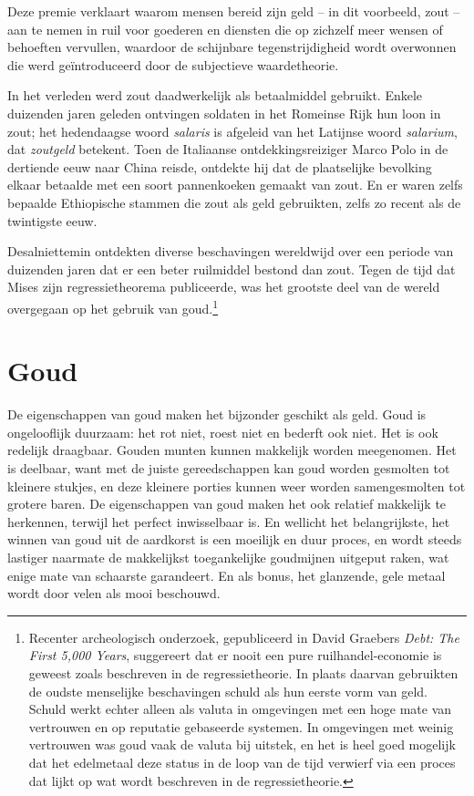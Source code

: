 \documentclass[
  a5paper,
  smalldemyvopaper,11pt,twoside,onecolumn,openright,extrafontsizes,
hidelinks]{memoir}
\begin{document}
Deze premie verklaart waarom mensen bereid zijn geld -- in dit
voorbeeld, zout -- aan te nemen in ruil voor goederen en diensten die op
zichzelf meer wensen of behoeften vervullen, waardoor de schijnbare
tegenstrijdigheid wordt overwonnen die werd geïntroduceerd door de
subjectieve waardetheorie.

In het verleden werd zout daadwerkelijk als betaalmiddel gebruikt.
Enkele duizenden jaren geleden ontvingen soldaten in het Romeinse Rijk
hun loon in zout; het hedendaagse woord \emph{salaris} is afgeleid van
het Latijnse woord \emph{salarium}, dat \emph{zoutgeld} betekent. Toen
de Italiaanse ontdekkingsreiziger Marco Polo in de dertiende eeuw naar
China reisde, ontdekte hij dat de plaatselijke bevolking elkaar betaalde
met een soort pannenkoeken gemaakt van zout. En er waren zelfs bepaalde
Ethiopische stammen die zout als geld gebruikten, zelfs zo recent als de
twintigste eeuw.

Desalniettemin ontdekten diverse beschavingen wereldwijd over een
periode van duizenden jaren dat er een beter ruilmiddel bestond dan
zout. Tegen de tijd dat Mises zijn regressietheorema publiceerde, was
het grootste deel van de wereld overgegaan op het gebruik van
goud.\footnote{Recenter archeologisch onderzoek, gepubliceerd in David
  Graebers \emph{Debt: The First 5,000 Years}, suggereert dat er nooit
  een pure ruilhandel-economie is geweest zoals beschreven in de
  regressietheorie. In plaats daarvan gebruikten de oudste menselijke
  beschavingen schuld als hun eerste vorm van geld. Schuld werkt echter
  alleen als valuta in omgevingen met een hoge mate van vertrouwen en op
  reputatie gebaseerde systemen. In omgevingen met weinig vertrouwen was
  goud vaak de valuta bij uitstek, en het is heel goed mogelijk dat het
  edelmetaal deze status in de loop van de tijd verwierf via een proces
  dat lijkt op wat wordt beschreven in de regressietheorie.}

\section{Goud}\label{goud}

De eigenschappen van goud maken het bijzonder geschikt als geld. Goud is
ongelooflijk duurzaam: het rot niet, roest niet en bederft ook niet. Het
is ook redelijk draagbaar. Gouden munten kunnen makkelijk worden
meegenomen. Het is deelbaar, want met de juiste gereedschappen kan goud
worden gesmolten tot kleinere stukjes, en deze kleinere porties kunnen
weer worden samengesmolten tot grotere baren. De eigenschappen van goud
maken het ook relatief makkelijk te herkennen, terwijl het perfect
inwisselbaar is. En wellicht het belangrijkste, het winnen van goud uit
de aardkorst is een moeilijk en duur proces, en wordt steeds lastiger
naarmate de makkelijkst toegankelijke goudmijnen uitgeput raken, wat
enige mate van schaarste garandeert. En als bonus, het glanzende, gele
metaal wordt door velen als mooi beschouwd.
\end{document}
